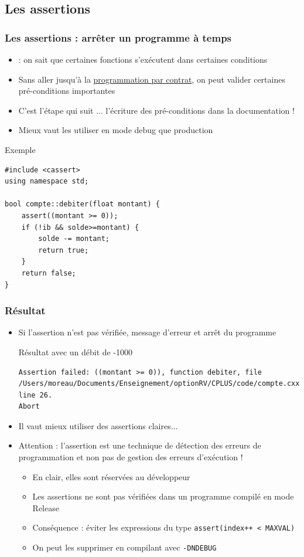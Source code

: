 \subsection{Les assertions}

\begin{frame}[fragile]\frametitle{Les assertions : arrêter un programme à temps}
\begin{itemize}
\item {} : on sait que certaines fonctions s'exécutent dans certaines conditions 
\item Sans aller jusqu'à la \href{http://fr.wikipedia.org/wiki/Programmation_par_contrat}{programmation par contrat}, on peut valider certaines pré-conditions importantes
\item C'est l'étape qui suit ... l'écriture des pré-conditions dans la documentation !
\item Mieux vaut les utiliser en mode debug que production
\end{itemize}
\begin{codeblock}{Exemple}
\begin{lstlisting}
#include <cassert>
using namespace std;

bool compte::debiter(float montant) {
    assert((montant >= 0));
    if (!ib && solde>=montant) {
        solde -= montant;
        return true;
    }
    return false;
}
\end{lstlisting}
\end{codeblock}
\end{frame}

\begin{frame}[fragile]\frametitle{Résultat}
\begin{itemize}
\item Si l'assertion n'est pas vérifiée, message d'erreur et arrêt du programme
\begin{block}{Résultat avec un débit de -1000}
{\tiny 
\begin{verbatim}
Assertion failed: ((montant >= 0)), function debiter, file /Users/moreau/Documents/Enseignement/optionRV/CPLUS/code/compte.cxx, line 26.
Abort
\end{verbatim}}
\end{block}
\item Il vaut mieux utiliser des assertions claires...
\item \alert{Attention} : l'assertion est une technique de détection des erreurs de programmation et non pas de gestion des erreurs d'exécution !
\begin{itemize}
\item En clair, elles sont réservées au développeur 
\item Les assertions ne sont pas vérifiées dans un programme compilé en mode Release
\item Conséquence : éviter les expressions du type \verb|assert(index++ < MAXVAL)|
\item On peut les supprimer en compilant avec \verb|-DNDEBUG|
\end{itemize}
\end{itemize}
\end{frame}


